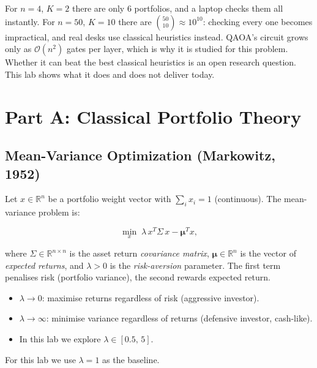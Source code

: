 \documentclass[a4paper,11pt]{article}
\begin{document}
\begin{warningbox}
For $n = 4$, $K = 2$ there are only 6 portfolios, and a laptop checks
them all instantly. For $n = 50$, $K = 10$ there are
$\binom{50}{10} \approx 10^{10}$: checking every one becomes impractical,
and real desks use classical heuristics instead. QAOA's circuit grows only
as $\mathcal{O}(n^2)$ gates per layer, which is why it is studied for this
problem. Whether it can beat the best classical heuristics is an open
research question. This lab shows what it does and does not deliver today.
\end{warningbox}

\section{Part A: Classical Portfolio Theory}

\subsection{Mean-Variance Optimization (Markowitz, 1952)}

Let $x \in \mathbb{R}^n$ be a portfolio weight vector with
$\sum_i x_i = 1$ (continuous). The mean-variance problem is:

\begin{equation}
    \min_x\; \lambda\, x^T \Sigma\, x - \boldsymbol\mu^T x,
    \label{eq:mv-cont}
\end{equation}

where $\Sigma \in \mathbb{R}^{n\times n}$ is the asset return
\emph{covariance matrix}, $\boldsymbol\mu \in \mathbb{R}^n$ is the
vector of \emph{expected returns}, and $\lambda > 0$ is the
\emph{risk-aversion} parameter. The first term penalises risk (portfolio
variance), the second rewards expected return.

\begin{defbox}
\begin{itemize}
    \item $\lambda \to 0$: maximise returns regardless of risk
          (aggressive investor).
    \item $\lambda \to \infty$: minimise variance regardless of returns
          (defensive investor, cash-like).
    \item In this lab we explore $\lambda \in [0.5,\, 5]$.
\end{itemize}
For this lab we use $\lambda = 1$ as the baseline.
\end{defbox}
\end{document}
